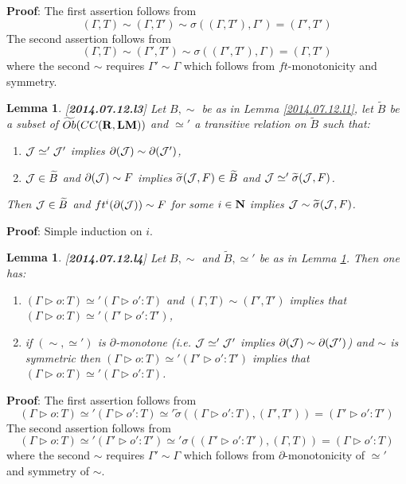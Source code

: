 \documentclass[11pt]{article}
\newenvironment{proof}{{\bf Proof}:}{\vskip 5mm }
\newtheorem{lemma}[proposition]{Lemma}
\newcommand{\llabel}[1]{\label{#1}[{\bf #1}]}
\newcommand{\nn}{{\bf N\rm}}
\newcommand{\nat}{\nn}
\newcommand{\rr}{{\bf R}}
\newcommand{\lm}{{\bf LM}}
\newcommand{\wt}{\widetilde}
\begin{document}
%
\begin{proof}
The first assertion follows from
%
$$(\Gamma,T)\sim (\Gamma,T')\sim \sigma((\Gamma,T'),\Gamma')=(\Gamma',T')$$
%
The second assertion  follows from
%
$$(\Gamma,T)\sim (\Gamma',T')\sim \sigma((\Gamma',T'),\Gamma)=(\Gamma,T')$$
%
where the second $\sim$ requires $\Gamma'\sim \Gamma$ which follows from $ft$-monotonicity and symmetry.
\end{proof}
%
\begin{lemma}
\llabel{2014.07.12.l3}
Let $B,\sim$ be as in Lemma \ref{2014.07.12.l1}, let $\wt{B}$ be a subset of $\wt{Ob}(CC(\rr,\lm))$ and $\simeq'$ a transitive relation on $\wt{B}$ such that: 
%
\begin{enumerate}
\item ${\cal J}\simeq' {\cal J}'$ implies $\partial({\cal J})\sim\partial({\cal J}')$,
\item ${\cal J}\in \wt{B}$ and $\partial({\cal J})\sim F$ implies $\wt{\sigma}({\cal J},F)\in \wt{B}$ and ${\cal J}\simeq' \wt{\sigma}({\cal J},F)$.
\end{enumerate}
%
Then ${\cal J}\in \wt{B}$ and $ft^i(\partial({\cal J}))\sim F$ for some $i\in\nat$ implies ${\cal J}\sim \wt{\sigma}({\cal J},F)$. 
\end{lemma}
%
\begin{proof}
Simple induction on $i$.
\end{proof}
%
\begin{lemma}
\llabel{2014.07.12.l4}
Let $B,\sim$ and $\wt{B},\simeq'$ be as in Lemma \ref{2014.07.12.l3}. Then one has:
%
\begin{enumerate}
\item $(\Gamma\rhd o:T)\simeq' (\Gamma\rhd o':T)$ and $(\Gamma,T)\sim (\Gamma',T')$ implies that $(\Gamma\rhd o:T)\simeq' (\Gamma'\rhd o':T')$,
\item if $(\sim,\simeq')$ is $\partial$-monotone (i.e. ${\cal J}\simeq' {\cal J}'$ implies $\partial({\cal J})\sim \partial({\cal J}')$) and $\sim$ is symmetric then $(\Gamma\rhd o:T)\simeq' (\Gamma'\rhd o':T')$ implies that $(\Gamma\rhd o:T)\simeq' (\Gamma\rhd o':T)$.
\end{enumerate}
\end{lemma}
%
\begin{proof}
The first assertion follows from
%
$$(\Gamma\rhd o:T)\simeq'  (\Gamma\rhd o':T)\simeq' \wt{\sigma}((\Gamma\rhd o':T) ,(\Gamma',T'))=(\Gamma'\rhd o':T')$$
%
The second assertion follows from
%
$$(\Gamma\rhd o:T)\simeq' (\Gamma'\rhd o':T')\simeq' \sigma((\Gamma'\rhd o':T'),(\Gamma,T))=(\Gamma\rhd o':T)$$
%
where the second $\sim$ requires $\Gamma'\sim \Gamma$ which follows from $\partial$-monotonicity of $\simeq'$ and symmetry of $\sim$.
\end{proof}
%
\end{document}
